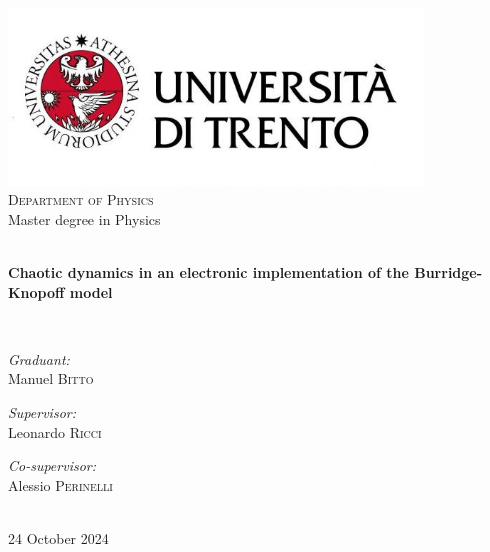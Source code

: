 \begin{titlepage}
    \begin{center}
    
    \includegraphics[width=11cm]{images/Logo Unitn.jpg}\\[1cm]
    
    \textsc{\Large Department of Physics}\\[1.5cm]
    
    {\Large Master degree in Physics}\\[1.5cm]
    
    \hrulefill \\[0.4cm]
    {\huge \bfseries Chaotic dynamics in an electronic implementation of the Burridge-Knopoff model\par}\vspace{0.4cm}
    \hrulefill \\[1.5cm]
    
    \begin{minipage}[t]{0.4\textwidth}
    \begin{flushleft} \large
    \emph{Graduant:}\\
    {Manuel \textsc{Bitto}}
    \end{flushleft}
    \end{minipage}
    \begin{minipage}[t]{0.4\textwidth}
    \begin{flushright} \large
    \emph{Supervisor:} \\
    {Leonardo \textsc{Ricci}}
    \end{flushright}
    \begin{flushright}
    \emph{Co-supervisor:}\\
    {Alessio \textsc{Perinelli}}
    \end{flushright}
    \end{minipage}\\[3cm]
    
    \vfill
    {\Large 24 October 2024}
    
    \end{center}
    \end{titlepage}